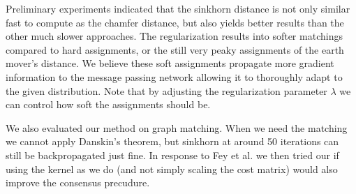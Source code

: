 Preliminary experiments indicated that the sinkhorn distance is not only similar fast to compute as the chamfer distance, but also yields better results than the other much slower approaches. The regularization results into softer matchings compared to hard assignments, or the still very peaky assignments of the earth mover's distance. We believe these soft assignments propagate more gradient information to the message passing network allowing it to thoroughly adapt to the given distribution. Note that by adjusting the regularization parameter $\lambda$ we can control how soft the assignments should be.

We also evaluated our method on graph matching. When we need the matching we cannot apply Danskin's theorem, but sinkhorn at around 50 iterations can still be backpropagated just fine. In response to Fey et al. we then tried our if using the kernel as we do (and not simply scaling the cost matrix) would also improve the consensus precudure.

